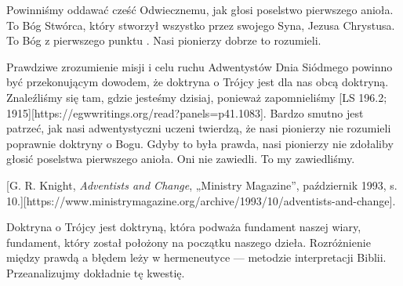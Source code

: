 Powinniśmy oddawać cześć Odwiecznemu, jak głosi poselstwo pierwszego anioła. To Bóg Stwórca, który stworzył wszystko przez swojego Syna, Jezusa Chrystusa. To Bóg z pierwszego punktu . Nasi pionierzy dobrze to rozumieli.

Prawdziwe zrozumienie misji i celu ruchu Adwentystów Dnia Siódmego powinno być przekonującym dowodem, że doktryna o Trójcy jest dla nas obcą doktryną. Znaleźliśmy się tam, gdzie jesteśmy dzisiaj, ponieważ zapomnieliśmy [LS 196.2; 1915][https://egwwritings.org/read?panels=p41.1083]. Bardzo smutno jest patrzeć, jak nasi adwentystyczni uczeni twierdzą, że nasi pionierzy nie rozumieli poprawnie doktryny o Bogu. Gdyby to była prawda, nasi pionierzy nie zdołaliby głosić poselstwa pierwszego anioła. Oni nie zawiedli. To my zawiedliśmy.

[G. R. Knight, \textit{Adventists and Change}, „Ministry Magazine”, październik 1993, s. 10.][https://www.ministrymagazine.org/archive/1993/10/adventists-and-change].

Doktryna o Trójcy jest doktryną, która podważa fundament naszej wiary, fundament, który został położony na początku naszego dzieła. Rozróżnienie między prawdą a błędem leży w hermeneutyce — metodzie interpretacji Biblii. Przeanalizujmy dokładnie tę kwestię.


